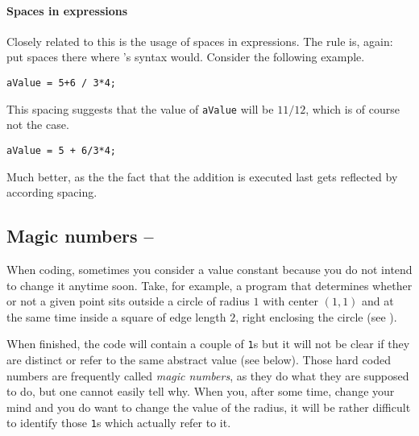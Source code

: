 \paragraph{Spaces in expressions} Closely related to this is the usage of spaces in expressions. The rule is, again: put spaces there where \matlab{}'s syntax would. Consider the following example.

\hfill
\begin{minipage}[t]{.45\textwidth}
\begin{lstlisting}[framerule=2pt,rulecolor=\color{badred}]
aValue = 5+6 / 3*4;
\end{lstlisting}
This spacing suggests that the value of \lstinline!aValue! will be $11/12$, which is of course not the case.
\end{minipage}
\hfill
\begin{minipage}[t]{.45\textwidth}
\begin{lstlisting}[framerule=2pt,rulecolor=\color{goodgreen}]
aValue = 5 + 6/3*4;
\end{lstlisting}
Much better, as the the fact that the addition is executed last gets reflected by according spacing.
\end{minipage}
\hfill



\subsection{Magic numbers -- \cleansymbol\cleansymbol\cleansymbol}

When coding, sometimes you consider a value constant because you do not intend
to change it anytime soon. Take, for example, a program that determines
whether or not a given point sits outside a circle of radius $1$ with center
$(1,1)$ and at the same time inside a square of edge length $2$, right
enclosing the circle (see \cite{Hull:2006:CCM}).

When finished, the code will contain a couple of \lstinline!1!s but it will
not be clear if they are distinct or refer to the same abstract value (see
below).  Those hard coded numbers are frequently called \emph{magic numbers},
as they do what they are supposed to do, but one cannot easily tell why. When
you, after some time, change your mind and you do want to change the value of
the radius, it will be rather difficult to identify those \lstinline!1!s which
actually refer to it.


